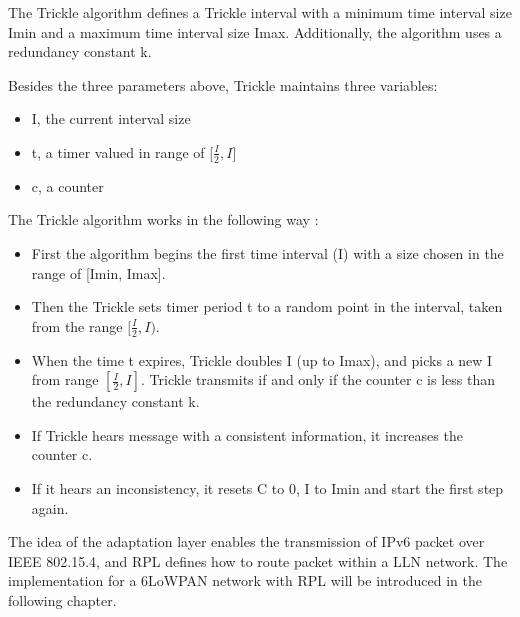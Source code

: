 The Trickle algorithm defines a Trickle interval with a minimum time interval size Imin and a maximum time interval size Imax. Additionally, the algorithm uses a redundancy constant k.

Besides the three parameters above, Trickle maintains three variables:
 \begin{itemize}
 \item I, the current interval size
 \newline
 
 \item t, a timer valued in range of [$\frac{I}{2}, I$]
 \newline
 
 \item c, a counter
\newline
\end{itemize}

The Trickle algorithm works in the following way \cite{RFC 6206}:
\begin{itemize}
\item First the algorithm begins the first time interval (I) with a size chosen in the range of [Imin, Imax].
\newline

\item Then the Trickle sets timer period t to a random point in the interval, taken from the range $[\frac{I}{2}, I)$.  
\newline
 
\item When the time t expires, Trickle doubles I (up to Imax), and picks a new I from range $[\frac{I}{2}, I]$.  Trickle transmits if and only if the counter c is less than the redundancy constant k.
\newline

\item If Trickle hears message with a consistent information, it increases the counter c.
\newline

\item If it hears an inconsistency, it resets C to 0, I to Imin and start the first step again.
\newline

\end{itemize}

The idea of the adaptation layer enables the transmission of IPv6 packet over IEEE 802.15.4, and RPL defines how to route packet within a LLN network. The implementation for a 6LoWPAN network with RPL will be introduced in the following chapter.






